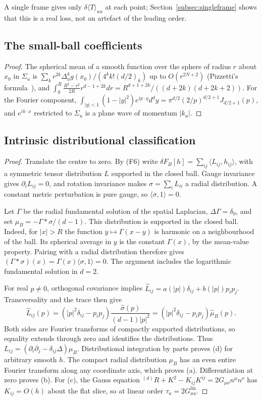 \documentclass[12pt]{article}
\theoremstyle{definition}
\theoremstyle{remark}
\newcommand{\Glin}{G^{\mathrm{lin}}}
\newcommand{\dT}{\delta\langle T\rangle}
\begin{document}
A single frame gives only \(\dT_{uu}\) at each point; Section~\ref{subsec:singleframe}
shows that this is a real loss, not an artefact of the leading order.


\subsection{The small-ball coefficients}
\label{app:prop:series}
\begin{proof}
The spherical mean of a smooth function over the sphere of radius \(r\) about \(x_0\) in
\(\Sigma_u\) is \(\sum_k r^{2k}\Delta_u^k g(x_0)/(4^kk!(d/2)_k)\) up to \(O(r^{2N+2})\)
(Pizzetti's formula~\cite{Pizzetti1909}), and
\(\int_0^R\frac{R^2-r^2}{2R}r^{d-1+2k}dr=R^{d+1+2k}/((d+2k)(d+2k+2))\). For the Fourier
component, \(\int_{|y|<1}(1-|y|^2)e^{ip\cdot y}d^dy=\pi^{d/2}(2/p)^{d/2+1}J_{d/2+1}(p)\), and
\(e^{ik\cdot x}\) restricted to \(\Sigma_u\) is a plane wave of momentum \(|k_u|\).
\end{proof}
\subsection{Intrinsic distributional classification}
\label{app:lem:tau}
\begin{proof}
Translate the centre to zero. By (F6) write
\(\delta F_B[h]=\sum_{ij}\langle L_{ij},h_{ij}\rangle\), with a symmetric tensor
distribution \(L\) supported in the closed ball. Gauge invariance gives
\(\partial_iL_{ij}=0\), and rotation invariance makes
\(\sigma=\sum_iL_{ii}\) a radial distribution. A constant metric perturbation is
pure gauge, so \(\langle\sigma,1\rangle=0\).

Let \(\Gamma\) be the radial fundamental solution of the spatial Laplacian,
\(\Delta\Gamma=\delta_0\), and set
\(\mu_B=-\Gamma*\sigma/(d-1)\). This distribution is supported in the closed ball.
Indeed, for \(|x|>R\) the function \(y\mapsto\Gamma(x-y)\) is harmonic on a
neighbourhood of the ball. Its spherical average in \(y\) is the constant
\(\Gamma(x)\), by the mean-value property. Pairing with a radial distribution
therefore gives \((\Gamma*\sigma)(x)=\Gamma(x)\langle\sigma,1\rangle=0\).
The argument includes the logarithmic fundamental solution in \(d=2\).

For real \(p\ne0\), orthogonal covariance implies
\(\widehat L_{ij}=a(|p|)\delta_{ij}+b(|p|)p_ip_j\).
Transversality and the trace then give
\[
\widehat L_{ij}(p)
=(|p|^2\delta_{ij}-p_ip_j)
 \frac{\widehat\sigma(p)}{(d-1)|p|^2}
=(|p|^2\delta_{ij}-p_ip_j)\widehat\mu_B(p).
\]
Both sides are Fourier transforms of compactly supported distributions, so equality
extends through zero and identifies the distributions. Thus
\(L_{ij}=(\partial_i\partial_j-\delta_{ij}\Delta)\mu_B\).
Distributional integration by parts proves (d) for arbitrary smooth \(h\).
The compact radial distribution \(\mu_B\) has an even entire Fourier transform
along any coordinate axis, which proves (a). Differentiation at zero proves (b).
For (c), the Gauss equation
\({}^{(d)}\!R+K^2-K_{ij}K^{ij}=2G_{\mu\nu}n^\mu n^\nu\) has \(K_{ij}=O(h)\) about the flat
slice, so at linear order \(\tau_u=2\Glin_{uu}\).
\end{proof}
\end{document}
